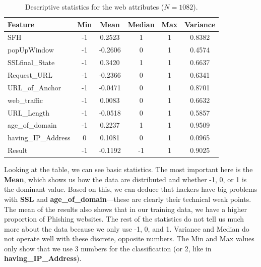 \documentclass[12pt,a4paper]{article}
\begin{document}
	\vspace{0.2cm} 
	
	\begin{table}[H] 
		\centering
		\caption{Descriptive statistics for the web attributes ($N = 1082$).}
		\label{tab:descriptive_stats}
		\begin{tabular}{lccccc}
			\toprule
			\textbf{Feature} & \textbf{Min} & \textbf{Mean} & \textbf{Median} & \textbf{Max} & \textbf{Variance} \\
			\midrule
			SFH                 & -1 &  0.2523 &  1 & 1 & 0.8382 \\
			popUpWindow         & -1 & -0.2606 &  0 & 1 & 0.4574 \\
			SSLfinal\_State     & -1 &  0.3420 &  1 & 1 & 0.6637 \\
			Request\_URL        & -1 & -0.2366 &  0 & 1 & 0.6341 \\
			URL\_of\_Anchor      & -1 & -0.0471 &  0 & 1 & 0.8701 \\
			web\_traffic        & -1 &  0.0083 &  0 & 1 & 0.6632 \\
			URL\_Length         & -1 & -0.0518 &  0 & 1 & 0.5857 \\
			age\_of\_domain      & -1 &  0.2237 &  1 & 1 & 0.9509 \\
			having\_IP\_Address   &  0 &  0.1081 &  0 & 1 & 0.0965 \\
			Result              & -1 & -0.1192 & -1 & 1 & 0.9025 \\
			\bottomrule
		\end{tabular}
	\end{table}
	
	Looking at the table, we can see basic statistics. The most important here is the \textbf{Mean}, which shows us how the data are distributed and whether -1, 0, or 1 is the dominant value. Based on this, we can deduce that hackers have big problems with \textbf{SSL} and \textbf{age\_of\_domain}—these are clearly their technical weak points. The mean of the results also shows that in our training data, we have a higher proportion of Phishing websites. 
	The rest of the statistics do not tell us much more about the data because we only use -1, 0, and 1. Variance and Median do not operate well with these discrete, opposite numbers. The Min and Max values only show that we use 3 numbers for the classification (or 2, like in \textbf{having\_IP\_Address}).
	
\end{document}
